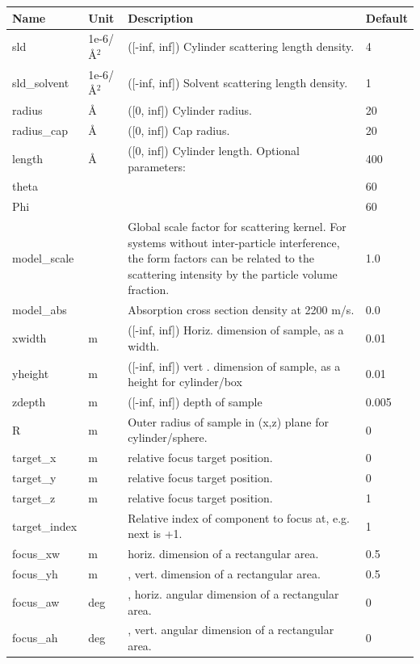 \begin{longtable}{p{}p{}p{}p{}}
\toprule
\textbf{Name} & \textbf{Unit} & \textbf{Description} & \textbf{Default} \\
\midrule
\endhead
sld & 1e-6/\AA{}$^{2}$ & ([-inf, inf]) Cylinder scattering length density. & 4 \\
sld\_solvent & 1e-6/\AA{}$^{2}$ & ([-inf, inf]) Solvent scattering length density. & 1 \\
radius & \AA{} & ([0, inf]) Cylinder radius. & 20 \\
radius\_cap & \AA{} & ([0, inf]) Cap radius. & 20 \\
length & \AA{} & ([0, inf]) Cylinder length. Optional parameters: & 400 \\
theta &  &  & 60 \\
Phi &  &  & 60 \\
model\_scale &   & Global scale factor for scattering kernel. For systems without inter-particle interference, the form factors can be related to the scattering intensity by the particle volume fraction. & 1.0 \\
model\_abs &   & Absorption cross section density at 2200 m/s. & 0.0 \\
xwidth & m & ([-inf, inf]) Horiz. dimension of sample, as a width. & 0.01 \\
yheight & m & ([-inf, inf]) vert . dimension of sample, as a height for cylinder/box & 0.01 \\
zdepth & m & ([-inf, inf]) depth of sample & 0.005 \\
R & m & Outer radius of sample in (x,z) plane for cylinder/sphere. & 0 \\
target\_x & m & relative focus target position. & 0 \\
target\_y & m & relative focus target position. & 0 \\
target\_z & m & relative focus target position. & 1 \\
target\_index &   & Relative index of component to focus at, e.g. next is +1. & 1 \\
focus\_xw & m & horiz. dimension of a rectangular area. & 0.5 \\
focus\_yh & m & , vert. dimension of a rectangular area. & 0.5 \\
focus\_aw & deg & , horiz. angular dimension of a rectangular area. & 0 \\
focus\_ah & deg & , vert. angular dimension of a rectangular area. & 0 \\

\end{longtable}
